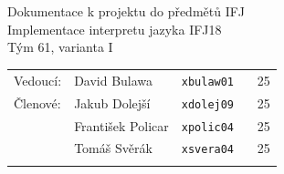 \documentclass[a4paper, 12pt]{article}
\begin{document}
\begin{titlepage}

\begin{center}
\fontsize{25}{20}\\
\fontsize{21}{0}\textsc{\selectfont{Fakulta informačních technologií}}\\


\begin{figure}[ht]
    \begin{center}
    \end{center}
\end{figure}

\Large{Dokumentace k projektu do předmětů IFJ}\\
\LARGE{Implementace interpretu jazyka IFJ18}\\
Tým 61, varianta I \\
\end{center}

\begin{large}
{\Large
\begin{tabular}{llll}
  \\[-0.5em]
  Vedoucí:  & David Bulawa        & \texttt{xbulaw01} \ & 25 \\
  Členové:  & Jakub Dolejší       & \texttt{xdolej09} \ & 25 \\
            & František Policar   & \texttt{xpolic04} \ & 25 \\
            & Tomáš Svěrák        & \texttt{xsvera04} \ & 25 \\ \medskip \\
\end{tabular}
}
\end{large}

\end{titlepage}
\end{document}
